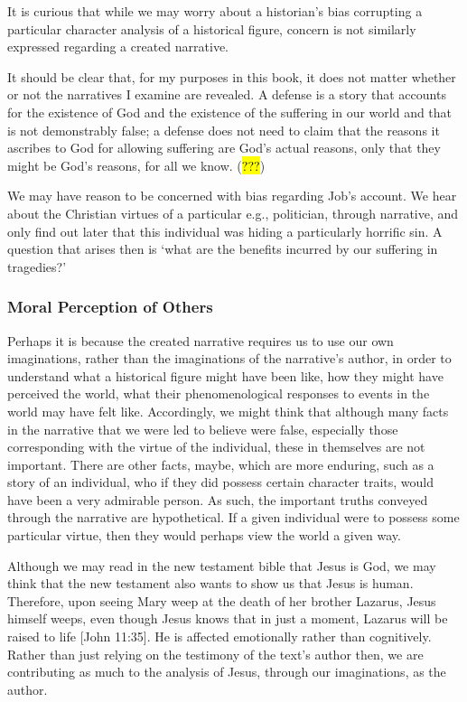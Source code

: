 \documentclass[
  letterpaper,
  DIV=11,
  numbers=noendperiod]{scrartcl}
\theoremstyle{remark}
\begin{document}
It is curious that while we may worry about a historian's bias
corrupting a particular character analysis of a historical figure,
concern is not similarly expressed regarding a created narrative.

It should be clear that, for my purposes in this book, it does not
matter whether or not the narratives I examine are revealed. A defense
is a story that accounts for the existence of God and the existence of
the suffering in our world and that is not demonstrably false; a defense
does not need to claim that the reasons it ascribes to God for allowing
suffering are God's actual reasons, only that they might be God's
reasons, for all we know. (\hl{???})

We may have reason to be concerned with bias regarding Job's account. We
hear about the Christian virtues of a particular e.g., politician,
through narrative, and only find out later that this individual was
hiding a particularly horrific sin. A question that arises then is `what
are the benefits incurred by our suffering in tragedies?'

\subsubsection{Moral Perception of
Others}\label{moral-perception-of-others}

Perhaps it is because the created narrative requires us to use our own
imaginations, rather than the imaginations of the narrative's author, in
order to understand what a historical figure might have been like, how
they might have perceived the world, what their phenomenological
responses to events in the world may have felt like. Accordingly, we
might think that although many facts in the narrative that we were led
to believe were false, especially those corresponding with the virtue of
the individual, these in themselves are not important. There are other
facts, maybe, which are more enduring, such as a story of an individual,
who if they did possess certain character traits, would have been a very
admirable person. As such, the important truths conveyed through the
narrative are hypothetical. If a given individual were to possess some
particular virtue, then they would perhaps view the world a given way.

Although we may read in the new testament bible that Jesus is God, we
may think that the new testament also wants to show us that Jesus is
human. Therefore, upon seeing Mary weep at the death of her brother
Lazarus, Jesus himself weeps, even though Jesus knows that in just a
moment, Lazarus will be raised to life {[}John 11:35{]}. He is affected
emotionally rather than cognitively. Rather than just relying on the
testimony of the text's author then, we are contributing as much to the
analysis of Jesus, through our imaginations, as the author.
\end{document}

